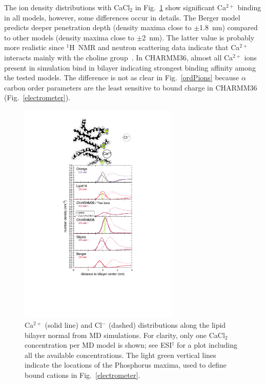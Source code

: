 \documentclass[twoside,twocolumn,9pt]{article}
\begin{document}
The ion density distributions with CaCl$_2$ in Fig.~\ref{CAdensitiesCLEAR} show significant
Ca$^{2+}$ binding in all models, however, some differences occur in details.
The Berger model predicts deeper penetration depth (density maxima close to $\pm$1.8~nm) compared
to other models (density maxima close to $\pm$2~nm). The latter value is probably more realistic 
since $^1$H~NMR and neutron scattering data indicate that Ca$^{2+}$ interacts mainly with the 
choline group~\cite{hauser76,hauser78,herbette84,cevc90}. In CHARMM36, almost all Ca$^{2+}$
ions present in simulation bind in bilayer indicating strongest binding affinity among the tested
models. The difference is not as clear in Fig.~\ref{ordPions} because $\alpha$ carbon order parameters 
are the least sensitive to bound charge in CHARMM36 (Fig.~\ref{electrometer}).
\begin{figure}[!h]
  \centering
  \includegraphics[width=7.6cm]{../Fig/CaDensities_withSnap.pdf}
  \caption{\label{CAdensitiesCLEAR}
    Ca$^{2+}$ (solid line) and Cl$^-$ (dashed) distributions along the lipid bi\-layer normal from MD simulations.
    For clarity, only one CaCl$_2$ concentration per MD model is shown;
    see ESI$^\dag$ for a plot including all the available concentrations.
    The light green vertical lines indicate the locations of the Phosphorus maxima,
    used to define bound cations in Fig.~\ref{electrometer}.
  }
\end{figure}
\end{document}
